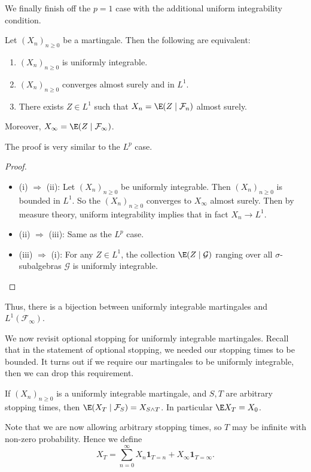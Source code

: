 \documentclass[a4paper]{article}
\begin{document}
We finally finish off the $p = 1$ case with the additional uniform integrability condition.
\begin{thm}[Convergence in $L^1$]
  Let $(X_n)_{n \geq 0}$ be a martingale. Then the following are equivalent:
  \begin{enumerate}
    \item $(X_n)_{n \geq 0}$ is uniformly integrable.
    \item $(X_n)_{n \geq 0}$ converges almost surely and in $L^1$.
    \item There exists $Z \in L^1$ such that $X_n = \E(Z \mid \mathcal{F}_n)$ almost surely.
  \end{enumerate}
  Moreover, $X_\infty = \E(Z \mid \mathcal{F}_\infty)$.
\end{thm}

The proof is very similar to the $L^p$ case.
\begin{proof}\leavevmode
  \begin{itemize}
    \item (i) $\Rightarrow$ (ii): Let $(X_n)_{n \geq 0}$ be uniformly integrable. Then $(X_n)_{n \geq 0}$ is bounded in $L^1$. So the $(X_n)_{n \geq 0}$ converges to $X_\infty$ almost surely. Then by measure theory, uniform integrability implies that in fact $X_n \to L^1$.
    \item (ii) $\Rightarrow$ (iii): Same as the $L^p$ case.
    \item (iii) $\Rightarrow$ (i): For any $Z \in L^1$, the collection $\E(Z \mid \mathcal{G})$ ranging over all $\sigma$-subalgebras $\mathcal{G}$ is uniformly integrable.\qedhere
  \end{itemize}
\end{proof}
Thus, there is a bijection between uniformly integrable martingales and $L^1(\mathcal{F}_\infty)$.

We now revisit optional stopping for uniformly integrable martingales. Recall that in the statement of optional stopping, we needed our stopping times to be bounded. It turns out if we require our martingales to be uniformly integrable, then we can drop this requirement.

\begin{thm}
  If $(X_n)_{n \geq 0}$ is a uniformly integrable martingale, and $S, T$ are arbitrary stopping times, then $\E(X_T \mid \mathcal{F}_S) = X_{S \wedge T}$. In particular $\E X_T = X_0$.
\end{thm}
Note that we are now allowing arbitrary stopping times, so $T$ may be infinite with non-zero probability. Hence we define
\[
  X_T = \sum_{n = 0}^\infty X_n \mathbf{1}_{T = n} + X_\infty \mathbf{1}_{T = \infty}.
\]
\end{document}
